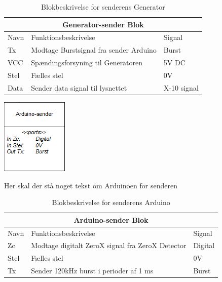 \documentclass[11pt]{article}
\begin{document}
\begin{table}[H]
\centering
	\begin{tabular}{l|l|l}
	
	\toprule[0.4mm]\midrule \multicolumn{3}{c}{\textbf{Generator-sender Blok}}\\
	\midrule[0.4mm] Navn & Funktionsbeskrivelse & Signal\\ \midrule[0.3mm]
	 Tx & Modtage Burstsignal fra sender Arduino & Burst\\
	 VCC & Spændingsforsyning til Generatoren & 5V DC\\
	 Stel & Fælles stel  & 0V\\
 	 Data & Sender data signal til lysnettet & X-10 signal\\
	 \midrule\bottomrule[0.4mm]

	\end{tabular}
	\caption{Blokbeskrivelse for senderens Generator}
	\label{tab: Bloktabel Generator sender}
\end{table}
\qquad

\begin{minipage}[Ht]{0.45\linewidth}
	\centering
	\includegraphics{Arduino-sender-blok.png}
\end{minipage}
\hfill
\begin{minipage}[!t]{0.45\linewidth}
	\centering
   Her skal der stå noget tekst om Arduinoen for senderen
\end{minipage}%
\hfill

\begin{table}[H]
\centering
	\begin{tabular}{l|l|l}
	
	\toprule[0.4mm]\midrule \multicolumn{3}{c}{\textbf{Arduino-sender Blok}}\\
	\midrule[0.4mm] Navn & Funktionsbeskrivelse & Signal\\ \midrule[0.3mm]
	 Zc & Modtage digitalt ZeroX signal fra ZeroX Detector & Digital\\
	 Stel & Fælles stel  & 0V\\
	 Tx & Sender 120kHz burst i perioder af 1 ms & Burst\\
	 \midrule\bottomrule[0.4mm]

	\end{tabular}
	\caption{Blokbeskrivelse for senderens Arduino}
	\label{tab: Bloktabel Arduino sender}
\end{table}
\qquad
\end{document}
